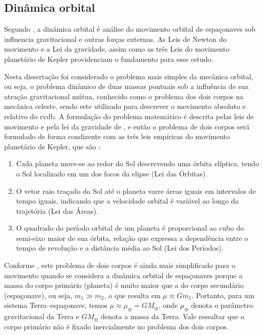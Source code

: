\subsection{Dinâmica orbital}
\label{sec:dinamica_orbital}
Segundo \cite{wie2008space}, a dinâmica orbital é análise do movimento orbital de espaçonaves sob influencia gravitacional e outras forças externas.
As Leis de Newton do movimento e a Lei da gravidade, assim como as três Leis do movimento planetário de Kepler providenciam o fundamento para esse estudo.

Nesta dissertação foi considerado o problema mais simples da mecânica orbital, ou seja, o problema dinâmico de duas massas pontuais sob a influência de sua atração gravitacional mútua, conhecido como o problema dos dois corpos na mecânica celeste, sendo este utilizado para descrever o movimento absoluto e relativo do \gls{rvdb}.
A formulação do problema matemático é descrita pelas leis de movimento e pela lei da gravidade de \cite{newton1713}, e então o problema de dois corpos será formulado de forma condizente com as três leis empíricas do movimento planetário de Kepler, que são \cite{kepler1609astronomia}:

\begin{enumerate}[label=(\roman*)]
    \item Cada planeta move-se ao redor do Sol descrevendo uma órbita elíptica, tendo o Sol localizado em um dos focos da elipse (Lei das Órbitas).
    \item O vetor raio traçado do Sol até o planeta varre áreas iguais em intervalos de tempo iguais, indicando que a velocidade orbital é variável ao longo da trajetória (Lei das Áreas).
    \item O quadrado do período orbital de um planeta é proporcional ao cubo do semi-eixo maior de sua órbita, relação que expressa a dependência entre o tempo de revolução e a distância média ao Sol (Lei dos Períodos).
\end{enumerate}

Conforme \cite{wie2008space}, este problema de dois corpos é ainda mais simplificado para o movimento quando se considera a dinâmica orbital de espaçonaves porque a massa do corpo primário (planeta) é muito maior que a do corpo secundário (espaçonave), ou seja, $m_1 \gg m_2$, o que resulta em $\mu \approx Gm_1$.
Portanto, para um sistema Terra--espaçonave, temos $\mu \approx \mu_\oplus = G M_\oplus$, onde $\mu_\oplus$ denota o parâmetro gravitacional da Terra e $G M_\oplus$ denota a massa da Terra.
Vale ressaltar que o corpo primário não é fixado inercialmente no problema dos dois corpos.


